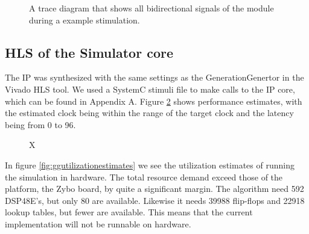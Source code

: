 \begin{figure}[htbp]
	\centering
	\caption{A trace diagram that shows all bidirectional signals of the module during a example stimulation.}
	\label{fig:generationgeneratortrace}
\end{figure}

\subsection{HLS of the Simulator core}

The IP was synthesized with the same settings as the GenerationGenertor in the Vivado HLS tool. We used a SystemC stimuli file to make calls to the IP core, which can be found in Appendix A. Figure \ref{fig:simperformanceestimates} shows performance estimates, with the estimated clock being within the range of the target clock and the latency being from  0 to 96. 

\begin{figure}[htbp]
	\centering
	\caption{X}
	\label{fig:simperformanceestimates}
\end{figure}

In figure \ref{fig:ggutilizationestimates} we see the utilization estimates of running the simulation in hardware. The total resource demand exceed those of the platform, the Zybo board, by quite a significant margin. The algorithm need 592 DSP48E's, but only 80 are available. Likewise it needs 39988 flip-flops and 22918 lookup tables, but fewer are available. This means that the current implementation will not be runnable on hardware.

